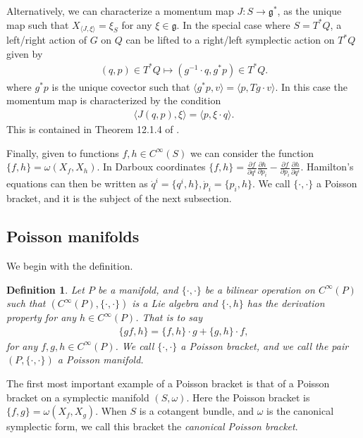 \documentclass[12pt]{amsart}
\newcommand{\pder}[2]{\ensuremath{\frac{\partial #1}{\partial #2}}}
\newtheorem{defn}[thm]{Definition}
\begin{document}
Alternatively, we can characterize a momentum map $J: S \to \mathfrak{g}^*$, as the unique map such that $X_{\langle J , \xi \rangle} = \xi_S$ for any $\xi \in \mathfrak{g}$.
In the special case where $S = T^*Q$, a left/right action of $G$ on $Q$ can be lifted to a right/left symplectic action on $T^*Q$ given by
\begin{align*}
  (q,p) \in T^*Q \mapsto (g^{-1} \cdot q , g^* p) \in T^*Q.
\end{align*}
where $g^*p$ is the unique covector such that $\langle g^*p , v \rangle = \langle p , Tg \cdot v \rangle$.
In this case the momentum map is characterized by the condition
\begin{align}
  \langle J(q,p) , \xi \rangle = \langle p , \xi \cdot q \rangle.
  \label{eq:cotangent_momap}
\end{align}
This is contained in Theorem 12.1.4 of \cite{MandS}.

Finally, given to functions $f,h \in C^{\infty}(S)$ we can consider the function $\{ f,h\} = \omega( X_f, X_h)$.
In Darboux coordinates $\{ f , h \} = \pder{f}{q^i} \pder{h}{p_i} - \pder{f}{p_i} \pder{h}{q^i}$.
Hamilton's equations can then be written as $\dot{q}^i = \{ q^i , h \},
\dot{p}_i = \{ p_i , h \}$.
We call $\{ \cdot , \cdot \}$ a Poisson bracket, and it is the subject of
the next subsection.

\subsection{Poisson manifolds}
\label{sec:Poisson}
We begin with the definition.

\begin{defn} \label{defn:Poisson}
  Let $P$ be a manifold, and $\{ \cdot , \cdot \}$ be a bilinear
  operation on $C^{\infty}(P)$ such that 
  $( C^{\infty}(P) , \{ \cdot , \cdot \} )$ is a Lie algebra
  and $\{ \cdot , h \}$ has the derivation property for any $h \in C^{\infty}(P)$.
  That is to say
  \begin{align*}
    \{ gf , h \} = \{ f , h \} \cdot g + \{ g , h \} \cdot f,
  \end{align*}
  for any $f,g,h \in C^{\infty}(P)$.
  We call $\{ \cdot , \cdot \}$ a \emph{Poisson bracket},
  and we call the pair $(P, \{ \cdot , \cdot \})$ a Poisson manifold.
\end{defn}

The first most important example of a Poisson bracket is
that of a Poisson bracket on a symplectic manifold $(S,\omega)$.
Here the Poisson bracket is $\{ f , g \} = \omega( X_f , X_g )$.
When $S$ is a cotangent bundle, and $\omega$ is the canonical
symplectic form, we call this bracket the \emph{canonical Poisson
bracket}.
\end{document}
